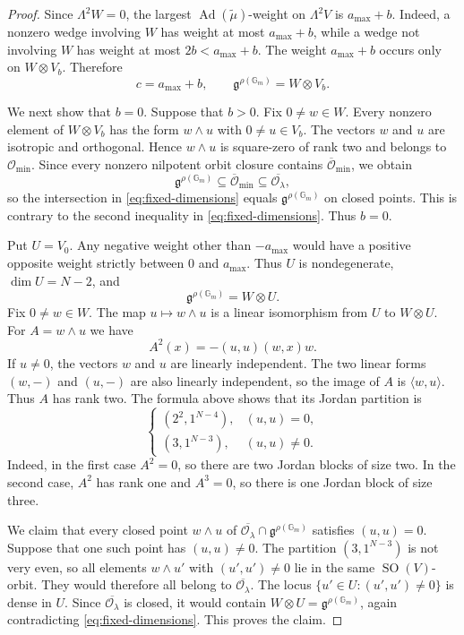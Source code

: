 \documentclass[12pt]{article}
\theoremstyle{remark}
\theoremstyle{plain}
\newcommand{\Gm}{\mathbb G_m}
\begin{document}
\begin{proof}
Since $\Lambda^2W=0$, the largest
$\operatorname{Ad}(\widetilde\mu)$-weight on $\Lambda^2V$ is
$a_{\max}+b$. Indeed, a nonzero wedge involving $W$ has weight at
most $a_{\max}+b$, while a wedge not involving $W$ has weight at most
$2b<a_{\max}+b$. The weight $a_{\max}+b$ occurs only on
$W\otimes V_b$. Therefore
\[
c=a_{\max}+b,
\qquad
\mathfrak g^{\rho(\Gm)}=W\otimes V_b.
\]

We next show that $b=0$. Suppose that $b>0$. Fix $0\ne w\in W$.
Every nonzero element of $W\otimes V_b$ has the form $w\wedge u$
with $0\ne u\in V_b$.
The vectors $w$ and $u$ are isotropic and orthogonal. Hence
$w\wedge u$ is square-zero of rank two and belongs to
$\mathcal O_{\min}$. Since every nonzero nilpotent orbit closure
contains $\overline{\mathcal O}_{\min}$, we obtain
\[
\mathfrak g^{\rho(\Gm)}
\subseteq\overline{\mathcal O}_{\min}
\subseteq\overline{\mathcal O_\lambda},
\]
so the intersection in \eqref{eq:fixed-dimensions} equals
$\mathfrak g^{\rho(\Gm)}$ on closed points. This is contrary to the
second inequality in \eqref{eq:fixed-dimensions}. Thus $b=0$.

Put $U=V_0$. Any negative weight other than $-a_{\max}$ would
have a positive opposite weight strictly between $0$ and $a_{\max}$.
Thus $U$ is nondegenerate, $\dim U=N-2$, and
\[
\mathfrak g^{\rho(\Gm)}=W\otimes U.
\]
Fix $0\ne w\in W$. The map $u\mapsto w\wedge u$ is a linear
isomorphism from $U$ to $W\otimes U$. For $A=w\wedge u$ we have
\[
A^2(x)=-(u,u)(w,x)w.
\]
If $u\ne0$, the vectors $w$ and $u$ are linearly independent. The
two linear forms $(w,-)$ and $(u,-)$ are also linearly independent,
so the image of $A$ is $\langle w,u\rangle$. Thus $A$ has rank two.
The formula above shows that its Jordan partition is
\[
\begin{cases}
(2^2,1^{N-4}),& (u,u)=0,\\
(3,1^{N-3}),& (u,u)\ne0.
\end{cases}
\]
Indeed, in the first case $A^2=0$, so there are two Jordan blocks of
size two. In the second case, $A^2$ has rank one and $A^3=0$, so there
is one Jordan block of size three.

We claim that every closed point $w\wedge u$ of
$\overline{\mathcal O_\lambda}\cap\mathfrak g^{\rho(\Gm)}$
satisfies $(u,u)=0$. Suppose that one such point has $(u,u)\ne0$.
The partition $(3,1^{N-3})$ is not very even, so all elements
$w\wedge u'$ with $(u',u')\ne0$ lie in the same
$\operatorname{SO}(V)$-orbit. They would therefore all belong to
$\overline{\mathcal O_\lambda}$. The locus
$\{u'\in U:(u',u')\ne0\}$ is dense in $U$. Since
$\overline{\mathcal O_\lambda}$ is closed, it would contain
$W\otimes U=\mathfrak g^{\rho(\Gm)}$, again contradicting
\eqref{eq:fixed-dimensions}. This proves the claim.


\end{proof}
\end{document}
